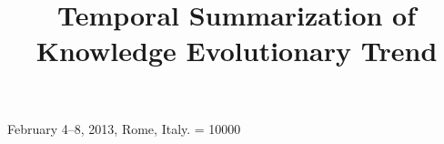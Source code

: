 \documentclass{sig-alternate}
\newcommand{\hide}[1]{} %
\begin{document}
 {February 4--8, 2013, Rome, Italy.}
\widowpenalty = 10000

\title{Temporal Summarization of Knowledge Evolutionary Trend
}

\hide{
\author{
\alignauthor Sen Wu\\
	\affaddr{Department of Computer Science}\\
	\affaddr{Tsinghua University}\\
	\affaddr{Beijing 100084, China}\\
	\email{ronaldosen@gmail.com}
\alignauthor Jimeng Sun\\
	\affaddr{IBM T. J. Watson Research Center}\\
	\affaddr{USA}\\
	\email{jimeng@us.ibm.com}
\alignauthor Jie Tang\\
	\affaddr{Department of Computer Science}\\
	\affaddr{Tsinghua University}\\
	\affaddr{Beijing 100084, China}\\
	\email{jietang@tsinghua.edu.cn}
}
}
\maketitle
\sloppy
%


\vspace{-0.1in}
\vspace{-0.06in}
\vspace{-0.06in}


%
%
%



%
%
%
%
%


%
\begin{thebibliography}{10}


\end{thebibliography}

\normalsize
\end{document}

